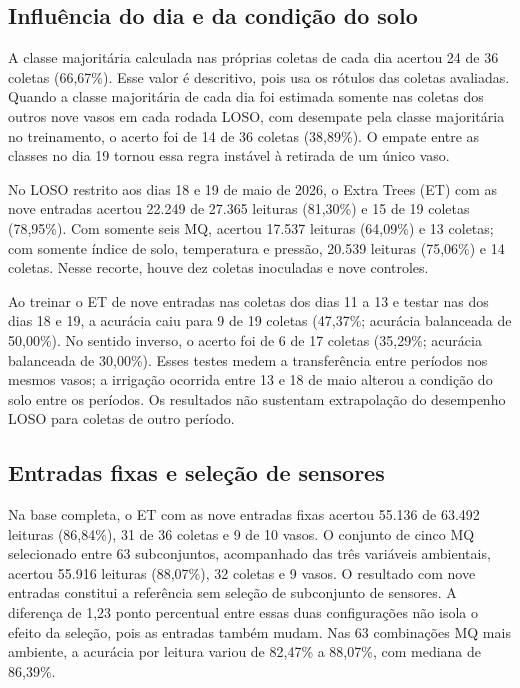 
\subsection{Influência do dia e da condição do solo}
\label{subsec:resultados_dia_periodo}

A classe majoritária calculada nas próprias coletas de cada dia acertou
24 de 36 coletas (66,67\%). Esse valor é descritivo, pois usa os rótulos
das coletas avaliadas. Quando a classe majoritária de cada dia foi
estimada somente nas coletas dos outros nove vasos em cada rodada LOSO,
com desempate pela classe majoritária no treinamento, o acerto foi de
14 de 36 coletas (38,89\%). O empate entre as classes no dia 19 tornou
essa regra instável à retirada de um único vaso.

No LOSO restrito aos dias 18 e 19 de maio de 2026, o Extra Trees (ET)
com as nove entradas acertou 22.249 de 27.365 leituras (81,30\%) e 15
de 19 coletas (78,95\%). Com somente seis MQ, acertou 17.537 leituras
(64,09\%) e 13 coletas; com somente índice de solo, temperatura e pressão,
20.539 leituras (75,06\%) e 14 coletas. Nesse recorte, houve dez coletas
inoculadas e nove controles.

Ao treinar o ET de nove entradas nas coletas dos dias 11 a 13 e testar
nas dos dias 18 e 19, a acurácia caiu para 9 de 19 coletas (47,37\%;
acurácia balanceada de 50,00\%). No sentido inverso, o acerto foi de
6 de 17 coletas (35,29\%; acurácia balanceada de 30,00\%). Esses testes
medem a transferência entre períodos nos mesmos vasos; a irrigação
ocorrida entre 13 e 18 de maio alterou a condição do solo entre os
períodos. Os resultados não sustentam extrapolação do desempenho LOSO
para coletas de outro período.

\subsection{Entradas fixas e seleção de sensores}
\label{subsec:resultados_entradas_fixas}

Na base completa, o ET com as nove entradas fixas acertou 55.136 de
63.492 leituras (86,84\%), 31 de 36 coletas e 9 de 10 vasos. O conjunto
de cinco MQ selecionado entre 63 subconjuntos, acompanhado das três
variáveis ambientais, acertou 55.916 leituras (88,07\%), 32 coletas e
9 vasos. O resultado com nove entradas constitui a referência sem
seleção de subconjunto de sensores. A diferença de 1,23 ponto percentual
entre essas duas configurações não isola o efeito da seleção, pois as
entradas também mudam. Nas 63 combinações MQ mais ambiente, a acurácia
por leitura variou de 82,47\% a 88,07\%, com mediana de 86,39\%.

